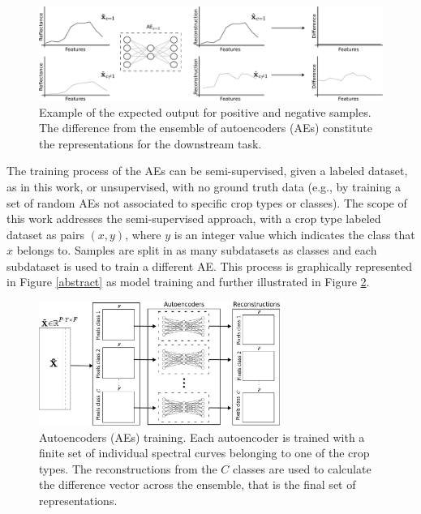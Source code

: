 \documentclass[journal,article,submit,pdftex,moreauthors]{Definitions/mdpi}
\begin{document}
\begin{figure}[H]
	\includegraphics[width=\textwidth]{figures/AE_example_corrected.pdf}
	\caption{Example of the expected output for positive and negative samples. The difference from the ensemble of autoencoders (AEs) constitute the representations for the downstream task.}
	\label{errors}
\end{figure}
The training process of the AEs can be semi-supervised, given a labeled dataset, as in this work, or unsupervised, with no ground truth data (e.g., by training a set of random \ac{AEs} not associated to specific crop types or classes). 
The scope of this work addresses the semi-supervised approach, with a crop type labeled dataset as pairs $(x,y)$, where $y$ is an integer value which indicates the class that $x$ belongs to. Samples are split in as many subdatasets as classes and each subdataset is used to train a different AE.
This process is graphically represented in Figure \ref{abstract} as model training and further illustrated in Figure \ref{aes_train}.

\begin{figure}[H]
	\centering
	\includegraphics[width=0.7\textwidth]{figures/training.pdf}
	\caption{Autoencoders (AEs) training. Each autoencoder is trained with a finite set of individual spectral curves belonging to one of the crop types. The reconstructions from the $C$ classes are used to calculate the difference vector across the ensemble, that is the final set of representations.}    
	\label{aes_train}      
\end{figure}
\end{document}
